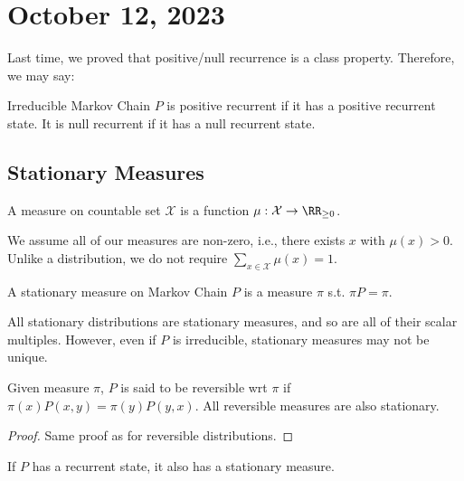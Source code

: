 \section{October 12, 2023}

Last time, we proved that positive/null recurrence is a class property. Therefore, we may say: 

\begin{definition}

Irreducible Markov Chain $P$ is positive recurrent if it has a positive recurrent state. It is null recurrent if it has a null recurrent state. 
\end{definition}

\subsection{Stationary Measures}

\begin{definition}

A \ac{measure} on countable set $\mathcal{X}$ is a function $\mu: \mathcal{X}\rightarrow \RR_{\geq 0}$. 
\end{definition}

We assume all of our measures are non-zero, i.e., there exists $x$ with $\mu(x) > 0$. Unlike a distribution, we do not require $\sum_{x\in \mathcal{X}}\mu(x) = 1$. 

\begin{definition}

A \ac{stationary measure} on Markov Chain $P$ is a measure $\pi$ s.t. $\pi P = \pi$. 
\end{definition}

All stationary distributions are stationary measures, and so are all of their scalar multiples. However, even if $P$ is irreducible, stationary measures may not be unique. 

\begin{theorem}
\proplabel

Given measure $\pi$, $P$ is said to be reversible wrt $\pi$ if $\pi(x)P(x,y) = \pi(y)P(y,x)$. All reversible measures are also stationary. 
\end{theorem}

\begin{proof}
Same proof as for reversible distributions.
\end{proof}

\begin{theorem}
\proplabel

If $P$ has a recurrent state, it also has a stationary measure. 
\end{theorem}

